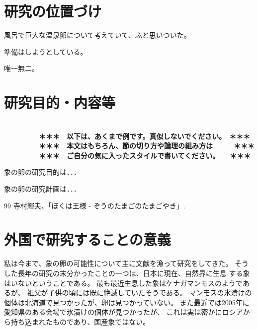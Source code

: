 \documentclass[11pt,a4j,dvipdfmx]{jarticle} 					%
\newcommand{\研究課題名}{象の卵}
\newcommand{\研究機関名}{逢坂大学}
\newcommand{\研究代表者氏名}{湯川秀樹}
\begin{document}

\section{研究の位置づけ}

		風呂で巨大な温泉卵について考えていて、ふと思いついた。

	準備はしようとしている。

	唯一無二。




\section{研究目的・内容等}

\textbf{\\　　　　　＊＊＊　以下は、あくまで例です。真似しないでください。　＊＊＊\\
　　　　　＊＊＊　本文はもちろん、節の切り方や論理の組み方は　　　＊＊＊\\
　　　　　＊＊＊　ご自分の気に入ったスタイルで書いてください。　　＊＊＊}

	 象の卵の研究目的は．．．

	象の卵の研究計画は．．．

	\vspace{1cm}
	\begin{thebibliography}{99}
		 寺村輝夫、「ぼくは王様 - ぞうのたまごのたまごやき」.
	\end{thebibliography}



\section{外国で研究することの意義}

	私は今まで、象の卵の可能性について主に文献を漁って研究をしてきた。
	そうした長年の研究の末分かったことの一つは、日本に現在、自然界に生息
	する象はいないということである。
	最も最近生息した象はケナガマンモスのようであるが、
	祖父が子供の頃には既に絶滅していたそうである。
	マンモスの氷漬けの個体は北海道で見つかったが、卵は見つかっていない。
	また最近では2005年に愛知県のある会場で氷漬けの個体が見つかったが、
	これは実は密かにロシアから持ち込まれたものであり、国産象ではない。
	
\end{document}
